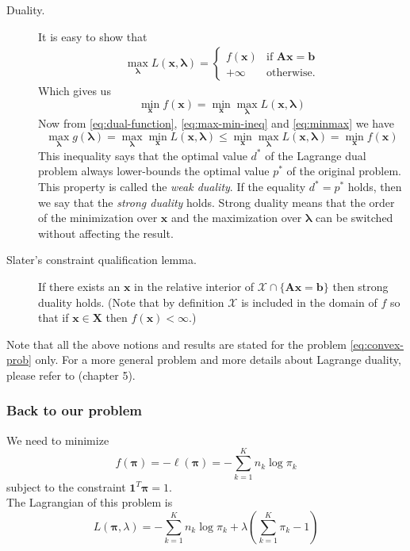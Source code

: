 \documentclass[12pt]{report}	%
\def\xb{\mathbf{x}}
\begin{document}
\begin{description}
\item[Duality.] It is easy to show that
\begin{align*}
\max_{\bm{\lambda}}L(\mathbf{x},\bm{\lambda}) = 
\begin{cases} f(\mathbf{x}) &\mbox{if } \mathbf{Ax=b} \\ 
			 +\infty				& \mbox{otherwise.} 
\end{cases}
\end{align*}
Which gives us
\begin{equation}
\label{eq:minmax}
\min_{\mathbf{x}} f(\mathbf{x}) = \min_{\mathbf{x}} \max_{\bm{\lambda}}L(\mathbf{x},\bm{\lambda})
\end{equation}
Now from \eqref{eq:dual-function}, \eqref{eq:max-min-ineq} and \eqref{eq:minmax} we have
\begin{equation}
\label{eq:weak-dual}
\max_{\bm{\lambda}} g(\bm{\lambda}) = \max_{\bm{\lambda}} \min_{\mathbf{x}} L(\mathbf{x},\bm{\lambda}) \le \min_{\mathbf{x}} \max_{\bm{\lambda}} L(\mathbf{x},\bm{\lambda}) = \min_{\mathbf{x}} f(\mathbf{x})
\end{equation}  
This inequality says that the optimal value $d^*$ of the Lagrange dual problem always lower-bounds the optimal value $p^*$ of the original problem. This property is called the  \textit{weak duality}. If the equality $d^*=p^*$ holds, then we say that the  \textit{strong duality} holds. Strong duality means that the order of the minimization over $\mathbf{x}$ and the maximization over $\bm{\lambda}$ can be switched without affecting the result.

\item[Slater's constraint qualification lemma.] If there exists an  $\mathbf{x}$ in the relative interior of $\mathcal{X} \cap \{\mathbf{Ax=b}\}$ then strong duality holds. (Note that by definition $\mathcal{X}$ is included in the domain of $f$ so that if $\xb \in \mathbf{X}$ then $f(\xb)<\infty$.)
\end{description}

Note that all the above notions and results are stated for the problem \eqref{eq:convex-prob} only. For a more general problem and more details about Lagrange duality, please refer to \cite{Boyd04} (chapter 5). 

\subsubsection*{Back to our problem}
We need to minimize
\begin{equation}
f(\bm{\pi}) = -\ell(\bm{\pi}) = -\sum_{k=1}^K n_k \log  \pi_k
\end{equation}
subject to the constraint $\mathbf{1}^T\bm{\pi}=1$.\\
The Lagrangian of this problem is
\begin{equation}
L(\bm{\pi},\lambda)= -\sum_{k=1}^K n_k \log  \pi_k + \lambda\left(\sum_{k=1}^K\pi_k -1\right)
\end{equation}
\end{document}
